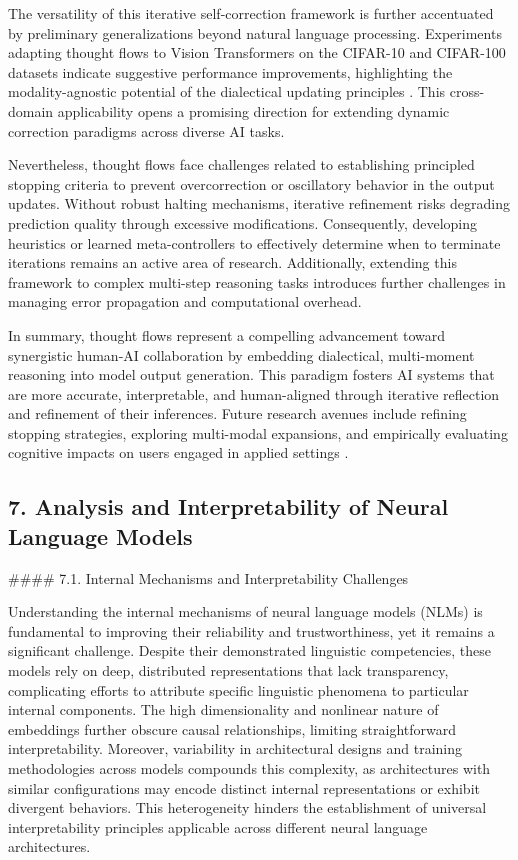 \documentclass[11pt]{article}
\begin{document}
The versatility of this iterative self-correction framework is further accentuated by preliminary generalizations beyond natural language processing. Experiments adapting thought flows to Vision Transformers on the CIFAR-10 and CIFAR-100 datasets indicate suggestive performance improvements, highlighting the modality-agnostic potential of the dialectical updating principles \cite{ref43}. This cross-domain applicability opens a promising direction for extending dynamic correction paradigms across diverse AI tasks.

Nevertheless, thought flows face challenges related to establishing principled stopping criteria to prevent overcorrection or oscillatory behavior in the output updates. Without robust halting mechanisms, iterative refinement risks degrading prediction quality through excessive modifications. Consequently, developing heuristics or learned meta-controllers to effectively determine when to terminate iterations remains an active area of research. Additionally, extending this framework to complex multi-step reasoning tasks introduces further challenges in managing error propagation and computational overhead.

In summary, thought flows represent a compelling advancement toward synergistic human-AI collaboration by embedding dialectical, multi-moment reasoning into model output generation. This paradigm fosters AI systems that are more accurate, interpretable, and human-aligned through iterative reflection and refinement of their inferences. Future research avenues include refining stopping strategies, exploring multi-modal expansions, and empirically evaluating cognitive impacts on users engaged in applied settings \cite{ref43}.

\subsection{7. Analysis and Interpretability of Neural Language Models}

#### 7.1. Internal Mechanisms and Interpretability Challenges

Understanding the internal mechanisms of neural language models (NLMs) is fundamental to improving their reliability and trustworthiness, yet it remains a significant challenge. Despite their demonstrated linguistic competencies, these models rely on deep, distributed representations that lack transparency, complicating efforts to attribute specific linguistic phenomena to particular internal components. The high dimensionality and nonlinear nature of embeddings further obscure causal relationships, limiting straightforward interpretability. Moreover, variability in architectural designs and training methodologies across models compounds this complexity, as architectures with similar configurations may encode distinct internal representations or exhibit divergent behaviors. This heterogeneity hinders the establishment of universal interpretability principles applicable across different neural language architectures.
\end{document}
